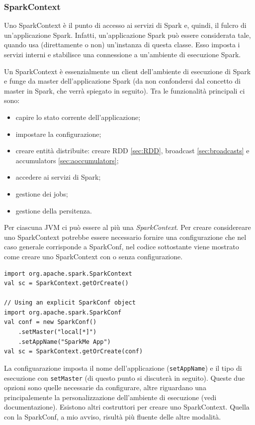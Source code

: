 \documentclass[12pt,italian]{article}
\begin{document}
\subsubsection{SparkContext}\label{sec:SparkContext} 
Uno SparkContext è il punto di accesso ai servizi di Spark e, quindi, il fulcro di un'applicazione Spark. Infatti, un'applicazione Spark può essere considerata tale, quando usa (direttamente o non) un'instanza di questa classe.
\newline
Esso imposta i servizi interni e stabilisce una connessione a un'ambiente di esecuzione Spark.

Un SparkContext è essenzialmente un client dell'ambiente di esecuzione di Spark e funge da master dell'applicazione Spark (da non confondersi dal concetto di master in Spark, che verrà spiegato in seguito). Tra le funzionalità principali ci sono:
\begin{itemize}
	\item capire lo stato corrente dell'applicazione;
	\item impostare la configurazione;
	\item creare entità distribuite:  creare RDD \ref{sec:RDD}, broadcast \ref{sec:broadcasts} e accumulators \ref{sec:aoccumulators};
	\item accedere ai servizi di Spark;
	\item gestione dei jobs;
	\item gestione della persitenza.
\end{itemize}
Per ciascuna JVM ci può essere al più una \textit{SparkContext}.
Per creare considereare uno SparkContext potrebbe essere necessario fornire una configurazione che nel caso generale corrisponde a SparkConf, nel codice sottostante viene mostrato come creare uno SparkContext con o senza configurazione.

\begin{lstlisting}
import org.apache.spark.SparkContext
val sc = SparkContext.getOrCreate()

// Using an explicit SparkConf object
import org.apache.spark.SparkConf
val conf = new SparkConf()
	.setMaster("local[*]")
	.setAppName("SparkMe App")
val sc = SparkContext.getOrCreate(conf)
\end{lstlisting}
La configuarazione imposta il nome dell'applicazione (\texttt{setAppName}) e il tipo di esecuzione con \texttt{setMaster} (di questo punto si discuterà in seguito). Queste due opzioni sono quelle necessarie da configurare, altre riguardano una principalemente la personalizzazione dell'ambiente di esecuzione (vedi documentazione).
Esistono altri costruttori per creare uno SparkContext. Quella con la SparkConf, a mio avviso, risultà più fluente delle altre modalità.
\end{document}
